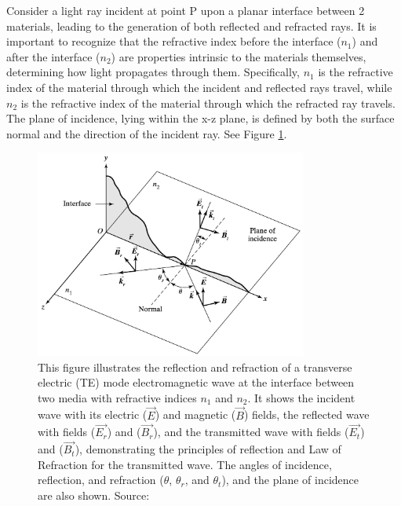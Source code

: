 Consider a light ray incident at point P upon a planar interface between 2 materials, leading to the generation of both reflected and refracted rays. It is important to recognize that the refractive index before the interface ($n_1$) and after the interface ($n_2$) are properties intrinsic to the materials themselves, determining how light propagates through them. Specifically, $n_1$ is the refractive index of the material through which the incident and reflected rays travel, while $n_2$ is the refractive index of the material through which the refracted ray travels. The plane of incidence, lying within the x-z plane, is defined by both the surface normal and the direction of the incident ray. See Figure \ref{fig:The TE Set-up}.

\begin{figure}[ht!]
  \centering
  \includegraphics[width=0.8\textwidth]{Chapters/Figures/Chapter 2 Figures/Incident, Reflected, and Transmitted Ray for TE Mode.png}
  \caption[The transverse electric (TE) set-up]{This figure illustrates the reflection and refraction of a transverse electric (TE) mode electromagnetic wave at the interface between two media with refractive indices $n_1$ and $n_2$. It shows the incident wave with its electric ($\vec{E}$) and magnetic ($\vec{B}$) fields, the reflected wave with fields ($\vec{E_r}$) and ($\vec{B_r}$), and the transmitted wave with fields ($\vec{E_t}$) and ($\vec{B_t}$), demonstrating the principles of reflection and Law of Refraction for the transmitted wave. The angles of incidence, reflection, and refraction ($\theta$, $\theta_r$, and $\theta_t$), and the plane of incidence are also shown. Source: \cite{pedrotti_introduction_2007}}
  \label{fig:The TE Set-up}
\end{figure}

